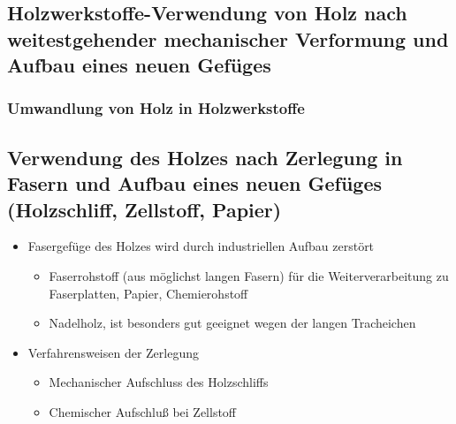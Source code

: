 \documentclass{article}
\begin{document}
\subsection{Holzwerkstoffe-Verwendung von Holz nach weitestgehender
mechanischer Verformung und Aufbau eines neuen Gefüges}
\subsubsection{Umwandlung von Holz in Holzwerkstoffe}
\subsection{Verwendung des Holzes nach Zerlegung in Fasern und Aufbau eines
neuen Gefüges (Holzschliff, Zellstoff, Papier)}
\begin{itemize}
  \item Fasergefüge des Holzes wird durch industriellen Aufbau zerstört
  \begin{itemize}
    \item Faserrohstoff (aus möglichst langen Fasern) für die Weiterverarbeitung
    zu Faserplatten, Papier, Chemierohstoff
    \item Nadelholz, ist besonders gut geeignet wegen der langen Tracheichen
  \end{itemize}
  \item Verfahrensweisen der Zerlegung
  \begin{itemize}
    \item Mechanischer Aufschluss des Holzschliffs
    \item Chemischer Aufschluß bei Zellstoff
    \end{itemize}
\end{itemize}
\end{document}
